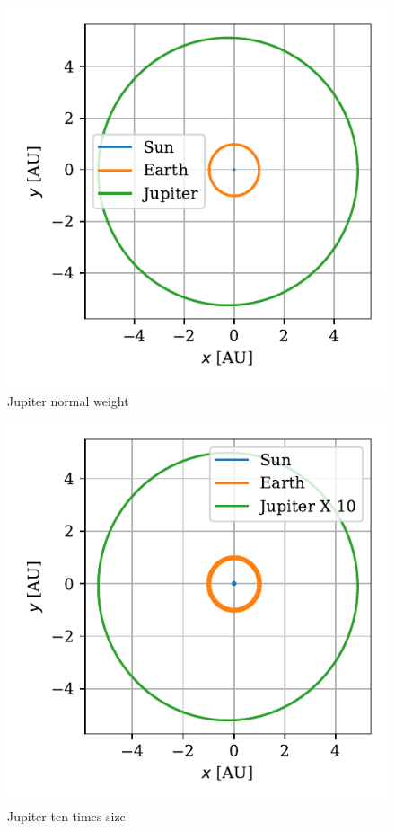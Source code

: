 \documentclass[twocolumn]{aastex62}
\begin{document}
\begin{figure}
\includegraphics[scale=1]{Figures/jupiter.pdf}
\caption{Jupiter normal weight}
\label{fig:jupiter}
\end{figure}

\begin{figure}
\includegraphics[scale=1]{Figures/jupiter10.pdf}
\caption{Jupiter ten times size}
\label{fig:jupiter10}
\end{figure}
\end{document}
